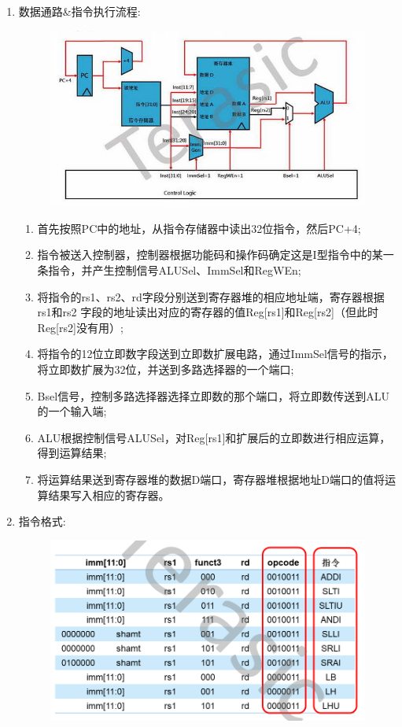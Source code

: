 \documentclass[a4paper, 14pt, oneside]{book} %
\numberwithin{equation}{subsection}
\begin{document}
\begin{enumerate}
\begin{enumerate}
\begin{figure}[!htbp]
								\end{figure}
						\item{数据通路\&指令执行流程:}
							\begin{figure}[!htbp]
								\centering
								\includegraphics[scale=0.5]{img/i2.png}
							\end{figure}
							\begin{enumerate}
								\item
									首先按照PC中的地址，从指令存储器中读出32位指令，然后PC+4;
								\item
									指令被送入控制器，控制器根据功能码和操作码确定这是I型指令中的某一条指令，并产生控制信号ALUSel、ImmSel和RegWEn;
								\item
									将指令的rs1、rs2、rd字段分别送到寄存器堆的相应地址端，寄存器根据rs1和rs2
									字段的地址读出对应的寄存器的值Reg[rs1]和Reg[rs2]（但此时Reg[rs2]没有用）;
								\item
									将指令的12位立即数字段送到立即数扩展电路，通过ImmSel信号的指示，将立即数扩展为32位，并送到多路选择器的一个端口;
								\item
									Bsel信号，控制多路选择器选择立即数的那个端口，将立即数传送到ALU的一个输入端;
								\item
									ALU根据控制信号ALUSel，对Reg[rs1]和扩展后的立即数进行相应运算，得到运算结果;
								\item
									将运算结果送到寄存器堆的数据D端口，寄存器堆根据地址D端口的值将运算结果写入相应的寄存器。
							\end{enumerate}
						\item{指令格式:}
							\begin{figure}[!htbp]
								\centering
								\includegraphics[scale=0.5]{img/i3.png}

\end{figure}
\end{enumerate}
\end{enumerate}
\end{document}
